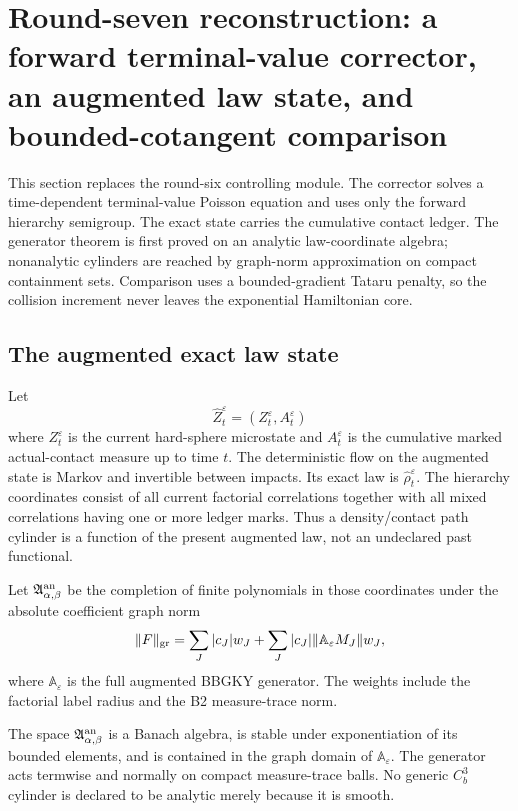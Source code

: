 \section{Round-seven reconstruction: a forward terminal-value corrector, an augmented law state, and bounded-cotangent comparison}
\label{sec:r7-b4}

This section replaces the round-six controlling module.  The corrector solves
a time-dependent terminal-value Poisson equation and uses only the forward
hierarchy semigroup.  The exact state carries the cumulative contact ledger.
The generator theorem is first proved on an analytic law-coordinate algebra;
nonanalytic cylinders are reached by graph-norm approximation on compact
containment sets.  Comparison uses a bounded-gradient Tataru penalty, so the
collision increment never leaves the exponential Hamiltonian core.

\subsection{The augmented exact law state}

Let
\[
 \widehat Z_t^\varepsilon=(Z_t^\varepsilon,A_t^\varepsilon)
\]
where $Z_t^\varepsilon$ is the current hard-sphere microstate and
$A_t^\varepsilon$ is the cumulative marked actual-contact measure up to time
$t$.  The deterministic flow on the augmented state is Markov and invertible
between impacts.  Its exact law is
$\widehat\rho_t^\varepsilon$.  The hierarchy coordinates consist of all
current factorial correlations together with all mixed correlations having
one or more ledger marks.  Thus a density/contact path cylinder is a function
of the present augmented law, not an undeclared past functional.

Let $\mathfrak A_{\alpha,\beta}^{\rm an}$ be the completion of finite
polynomials in those coordinates under the absolute coefficient graph norm
\[
 \|F\|_{\rm gr}=\sum_J|c_J|w_J+
 \sum_J|c_J|\|\mathbb A_\varepsilon M_J\|w_J,
\]
where $\mathbb A_\varepsilon$ is the full augmented BBGKY generator.  The
weights include the factorial label radius and the B2 measure-trace norm.

\begin{lemma}
\label{lem:r7-b4-algebra}
The space $\mathfrak A_{\alpha,\beta}^{\rm an}$ is a Banach algebra, is stable
under exponentiation of its bounded elements, and is contained in the graph
domain of $\mathbb A_\varepsilon$.  The generator acts termwise and normally
on compact measure-trace balls.  No generic $C_b^3$ cylinder is declared to be
analytic merely because it is smooth.
\end{lemma}

